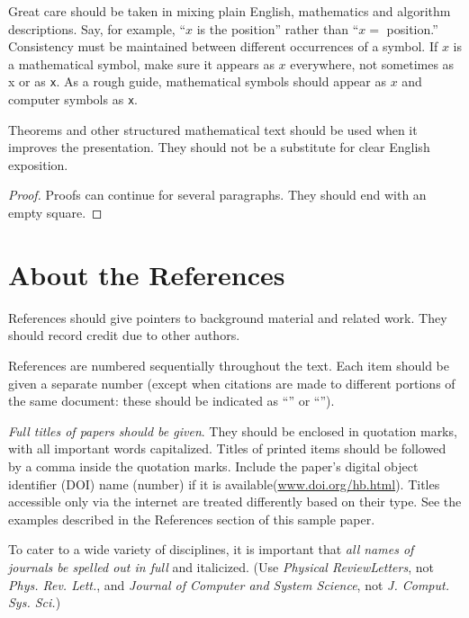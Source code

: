 \documentclass{article}
\begin{document}
Great care should be taken in mixing plain English, mathematics and algorithm descriptions. Say, for example, {``}\(x\) is the position{''} rather than {``}\(x=\) position.{''} Consistency must be maintained between different occurrences of a symbol. If \(x\) is a mathematical symbol, make sure it appears as \(x\) everywhere, not sometimes as x or as \texttt{x}. As a rough guide, mathematical symbols should appear as \(x\) and computer symbols as \texttt{x}. 

\begin{theorem}
Theorems and other structured mathematical text should be used when it improves the presentation. They should not be a substitute for clear English exposition. 
\end{theorem}

\begin{proof}
Proofs can continue for several paragraphs. They should end with an empty square.
\end{proof}


\section{About the References}

References should give pointers to background material and related work. They should record credit due to other authors. 

References are numbered sequentially throughout the text. 
Each item should be given a separate number (except when citations are made to different portions of the same document: these should be indicated as {``}\cite[pp. 3--56]{text-a}{''} or {``}\cite[Chapter 14]{text-b}{''}). 

\textit{Full titles of papers should be given}. They should be enclosed in quotation marks, with all important words capitalized. Titles of printed items should be followed by a comma inside the quotation marks. Include the paper{'}s digital object identifier (DOI) name (number) if it is available(\url{www.doi.org/hb.html}). Titles accessible only via the internet are treated differently based on their type. See the examples described in the References section of this sample paper.

To cater to a wide variety of disciplines, it is important that \textit{all names of journals be spelled out in full} and italicized. (Use \textit{Physical ReviewLetters}, not\textit{ Phys. Rev. Lett.}, and \textit{Journal of Computer and System Science}, not \textit{J. Comput. Sys. Sci.}) 
\end{document}
